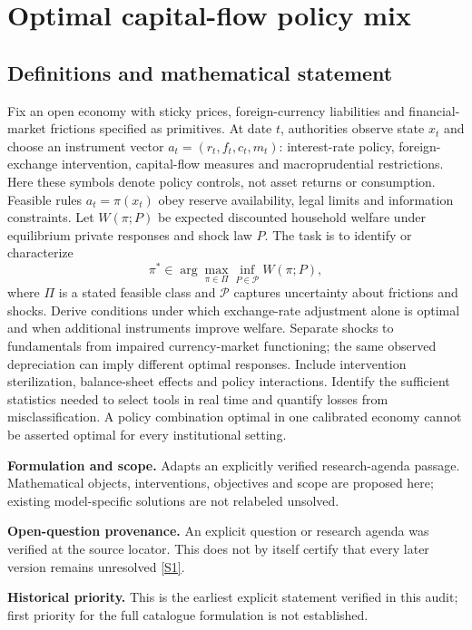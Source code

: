 \documentclass[11pt]{article}
\newcommand{\sref}[2]{\hyperlink{source:#1:#2}{[S#2]}}
\begin{document}
\section*{Optimal capital-flow policy mix}\label{30007619}
\subsection{Definitions and mathematical statement}
Fix an open economy with sticky prices, foreign-currency liabilities and financial-market frictions specified as primitives. At date \(t\), authorities observe state \(x_t\) and choose an instrument vector \(a_t=(r_t,f_t,c_t,m_t)\): interest-rate policy, foreign-exchange intervention, capital-flow measures and macroprudential restrictions. Here these symbols denote policy controls, not asset returns or consumption. Feasible rules \(a_t=\pi(x_t)\) obey reserve availability, legal limits and information constraints. Let \(W(\pi;P)\) be expected discounted household welfare under equilibrium private responses and shock law \(P\). The task is to identify or characterize
\[\pi^*\in\arg\max_{\pi\in\Pi}\inf_{P\in\mathcal P}W(\pi;P),\]
where \(\Pi\) is a stated feasible class and \(\mathcal P\) captures uncertainty about frictions and shocks. Derive conditions under which exchange-rate adjustment alone is optimal and when additional instruments improve welfare. Separate shocks to fundamentals from impaired currency-market functioning; the same observed depreciation can imply different optimal responses. Include intervention sterilization, balance-sheet effects and policy interactions. Identify the sufficient statistics needed to select tools in real time and quantify losses from misclassification. A policy combination optimal in one calibrated economy cannot be asserted optimal for every institutional setting.

\par\textbf{Formulation and scope.} Adapts an explicitly verified research-agenda passage. Mathematical objects, interventions, objectives and scope are proposed here; existing model-specific solutions are not relabeled unsolved.

\par\textbf{Open-question provenance.} An explicit question or research agenda was verified at the source locator. This does not by itself certify that every later version remains unresolved \sref{30007619}{1}.

\par\textbf{Historical priority.} This is the earliest explicit statement verified in this audit; first priority for the full catalogue formulation is not established.
\end{document}
